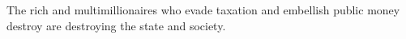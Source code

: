 The rich and multimillionaires who evade taxation and embellish public money destroy are destroying the state and society.